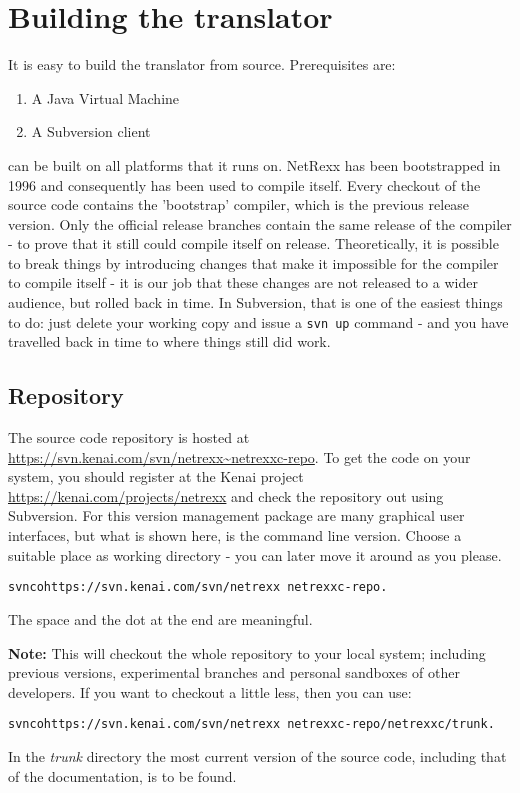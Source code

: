 \chapter{Building the \nr{} translator}
It is easy to build the \nr{} translator from source. Prerequisites
are:
\begin{enumerate}
\item A Java Virtual Machine
\item A Subversion client
\end{enumerate}
\nr{} can be built on all platforms that it runs on.  NetRexx has been
bootstrapped in 1996 and consequently has been used to compile
itself. Every checkout of the source code contains the 'bootstrap'
compiler, which is the previous release version. Only the official
release branches contain the same release of the compiler - to prove
that it still could compile itself on release. Theoretically, it is
possible to break things by introducing changes that make it
impossible for the compiler to compile itself - it is our job that
these changes are not released to a wider audience, but rolled back in
time. In Subversion, that is one of the easiest things to do: just
delete your working copy and issue a \texttt{svn up} command - and you
have travelled back in time to where things still did work.
\section{Repository}
The \nr{} source code repository is hosted at\\
\url{https://svn.kenai.com/svn/netrexx~netrexxc-repo}. To get the code
on your system, you should register at the Kenai project
\url{https://kenai.com/projects/netrexx} and check the repository out
using Subversion. For this version management package are many
graphical user interfaces, but what is shown here, is the command line
version. Choose a suitable place as working directory - you can later
move it around as you please.
\begin{alltt}
svn co https://svn.kenai.com/svn/netrexx~netrexxc-repo .
\end{alltt}
The space and the dot at the end are meaningful. 
\begin{shaded}\noindent
\textbf{Note:} This will checkout
the whole repository to your local system; including previous
versions, experimental branches and personal sandboxes of other
developers. If you want to checkout a little less, then you can use:
\begin{alltt}
svn co https://svn.kenai.com/svn/netrexx~netrexxc-repo/netrexxc/trunk .
\end{alltt}
\end{shaded}\indent
In the \emph{trunk} directory the most current version of the source
code, including that of the documentation, is to be found. 
